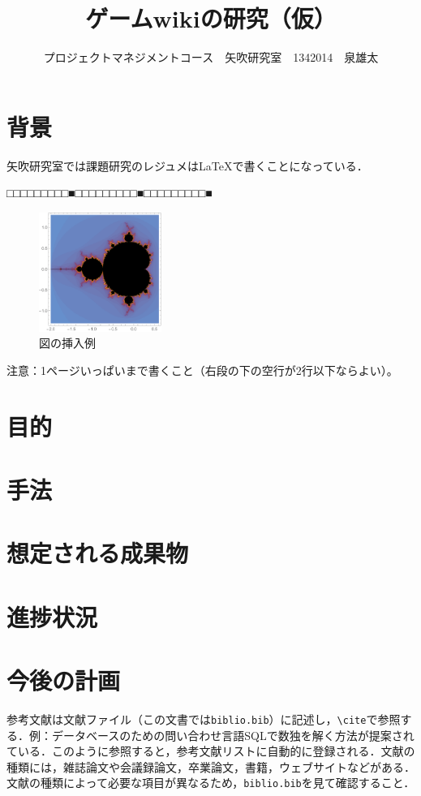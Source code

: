 \documentclass[uplatex,twocolumn,dvipdfmx]{jsarticle}
\title{\vspace{-5mm}\fontsize{14pt}{0pt}\selectfont ゲームwikiの研究（仮）}
\author{\normalsize プロジェクトマネジメントコース　矢吹研究室　1342014　泉雄太}
\date{}
\begin{document}
\fontsize{10.5pt}{\baselineskip}\selectfont
\maketitle





\section{背景}

矢吹研究室では課題研究のレジュメは\LaTeX で書くことになっている．

\noindent
□□□□□□□□□■□□□□□□□□□■□□□□□□□□□■

\begin{figure}[h]
\centering
\includegraphics[width=4cm,clip]{figure.pdf}
\caption{図の挿入例}\label{サンプル図}
\end{figure}

\noindent
注意：1ページいっぱいまで書くこと（右段の下の空行が2行以下ならよい）。

\section{目的}

\section{手法}

\section{想定される成果物}

\section{進捗状況}

\section{今後の計画}

参考文献は文献ファイル（この文書では\verb|biblio.bib|）に記述し，\verb|\cite|で参照する．例：データベースのための問い合わせ言語SQLで数独を解く方法が提案されている\cite{yabuki2011}．このように参照すると，参考文献リストに自動的に登録される．文献の種類には，雑誌論文\cite{yabuki2011}や会議録論文\cite{yabuki2013}，卒業論文\cite{kubo2014}，書籍\cite{okumura2013}，ウェブサイト\cite{self}などがある．文献の種類によって必要な項目が異なるため，\verb|biblio.bib|を見て確認すること．


\end{document}
